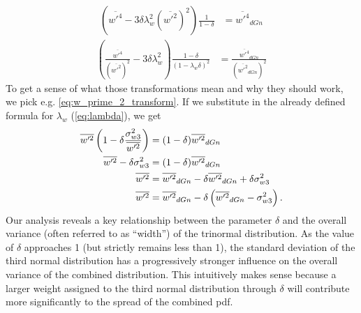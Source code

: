 \begin{align}
    \label{eq:w_prime_4_transform}
    \left(\overline{w'^4} - 3\delta\lambda_w^2 \left(\overline{w'^2}\right)^2\right) \frac{1}{1 - \delta}
    &= \overline{w'^4}_{dGn}
\end{align}
\begin{align}
    \label{eq:w_prime_4_div_w_prime_2_transform}
    \left(\frac{\overline{w'^4}}{(\overline{w'^2})^2} - 3\delta\lambda_w^2 \right) \frac{1 - \delta}{(1 - \lambda_w\delta)^2}
    &= \frac{\overline{w'^4}_{dGn}}{(\overline{w'^2}_{dGn})^2}
\end{align}
To get a sense of what those transformations mean and why they should work,
we pick e.g. \cref{eq:w_prime_2_transform}.
If we substitute in the already defined formula for $\lambda_w$ (\cref{eq:lambda}), we get
\begin{align}
    \overline{w'^2} \left(1 - \delta\frac{\sigma_{w 3}^2}{\overline{w'^2}}\right)
    &= (1 - \delta)\overline{w'^2}_{dGn} \nonumber\\
    \overline{w'^2} - \delta\sigma_{w 3}^2
    &= (1 - \delta)\overline{w'^2}_{dGn} \nonumber\\
    \overline{w'^2}
    &= \overline{w'^2}_{dGn} - \delta\overline{w'^2}_{dGn} + \delta\sigma_{w 3}^2 \nonumber\\
    \overline{w'^2}
    &= \overline{w'^2}_{dGn} - \delta\left(\overline{w'^2}_{dGn} - \sigma_{w 3}^2\right).
\end{align}
Our analysis reveals a key relationship between the parameter $\delta$
and the overall variance (often referred to as \enquote{width}) of the trinormal distribution.
As the value of $\delta$ approaches 1 (but strictly remains less than 1),
the standard deviation of the third normal distribution
has a progressively stronger influence on the overall variance of the combined distribution.
This intuitively makes sense because a larger weight assigned to the third normal distribution through $\delta$
will contribute more significantly to the spread of the combined \gls{pdf}.

